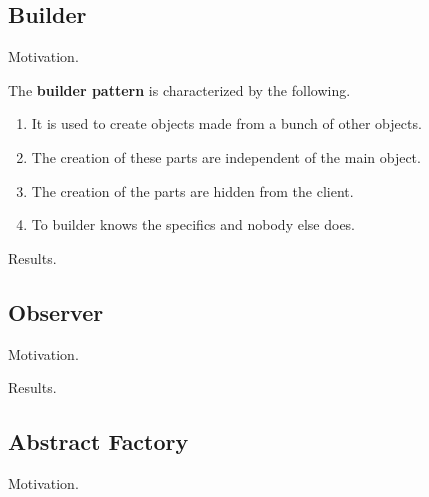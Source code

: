 \subsection{Builder} 

  Motivation. 

  \begin{definition}
    The \textbf{builder pattern} is characterized by the following. 
    \begin{enumerate}
      \item It is used to create objects made from a bunch of other objects. 
      \item The creation of these parts are independent of the main object. 
      \item The creation of the parts are hidden from the client. 
      \item To builder knows the specifics and nobody else does. 
    \end{enumerate}
  \end{definition}

  Results. 

  \begin{example}
    
  \end{example}

\subsection{Observer} 

  Motivation. 

  \begin{definition}[]
    
  \end{definition}

  Results. 

  \begin{example}
    
  \end{example}

\subsection{Abstract Factory}

  Motivation. 

  \begin{definition}
    
  \end{definition}

